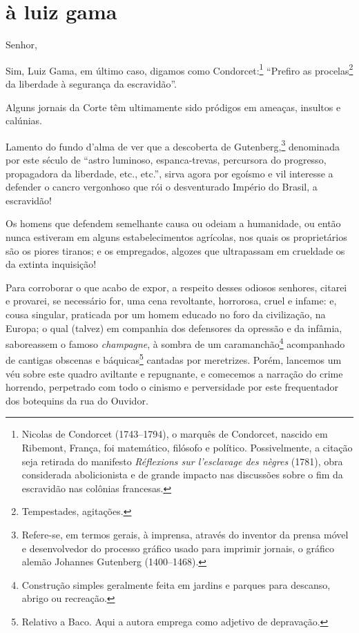 \section*{à luiz gama}

\noindent{}Senhor,%


Sim, Luiz Gama, em último caso, digamos como Condorcet:\footnote{
  Nicolas de Condorcet (1743--1794), o marquês de Condorcet, nascido em
  Ribemont, França, foi matemático, filósofo e político. Possivelmente,
  a citação seja retirada do manifesto \emph{Réflexions sur l'esclavage des nègres} (1781), obra considerada abolicionista e de grande impacto
  nas discussões sobre o fim da escravidão nas colônias francesas.}
``Prefiro as procelas\footnote{Tempestades, agitações.} da liberdade à
segurança da escravidão''.

Alguns jornais da Corte têm ultimamente sido pródigos em ameaças,
insultos e calúnias.

Lamento do fundo d'alma de ver que a descoberta de Gutenberg,\footnote{
  Refere-se, em termos gerais, à imprensa, através do inventor da prensa
  móvel e desenvolvedor do processo gráfico usado para imprimir jornais,
  o gráfico alemão Johannes Gutenberg (1400--1468).} denominada por este
século de ``astro luminoso, espanca-trevas, percursora do progresso,
propagadora da liberdade, etc., etc.'', sirva agora por egoísmo e vil
interesse a defender o cancro vergonhoso que rói o desventurado Império
do Brasil, a escravidão!

Os homens que defendem semelhante causa ou odeiam a humanidade, ou então
nunca estiveram em alguns estabelecimentos agrícolas, nos quais os
proprietários são os piores tiranos; e os empregados, algozes que
ultrapassam em crueldade os da extinta inquisição!

Para corroborar o que acabo de expor, a respeito desses odiosos
senhores, citarei e provarei, se necessário for, uma cena revoltante,
horrorosa, cruel e infame: e, cousa singular, praticada por um homem
educado no foro da civilização, na Europa; o qual (talvez) em companhia
dos defensores da opressão e da infâmia, saboreassem o famoso
\emph{champagne}, à sombra de um caramanchão\footnote{Construção
  simples geralmente feita em jardins e parques para descanso, abrigo ou
  recreação.} acompanhado de cantigas obscenas e báquicas\footnote{
  Relativo a Baco. Aqui a autora emprega como adjetivo de depravação.} 
cantadas por meretrizes. Porém, lancemos um véu sobre este quadro
aviltante e repugnante, e comecemos a narração do crime horrendo,
perpetrado com todo o cinismo e perversidade por este frequentador dos
botequins da rua do Ouvidor.

